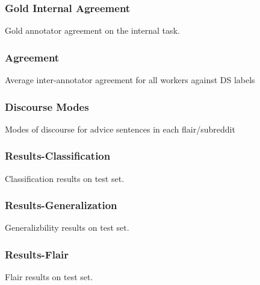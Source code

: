 \begin{frame}[c]\frametitle{Gold Internal Agreement}
    \begin{table}[H]
        \centering
        
        \caption{Gold annotator agreement on the internal task.}
        \label{tab:internal-agreement}
    \end{table}
\end{frame}

\begin{frame}[c]\frametitle{Agreement}
    \begin{table}[H]
        \centering
        
        \caption{Average inter-annotator agreement for all workers against DS labels}
        \label{tab:agreement}
    \end{table}
\end{frame}

\begin{frame}[c]\frametitle{Discourse Modes}
    \begin{table}[H]
        \centering
        
        \caption{Modes of discourse for advice sentences in each flair/subreddit}
        \label{tab:disc-modes}
    \end{table}
\end{frame}

\begin{frame}[c]\frametitle{Results-Classification}
    \begin{table}[H]
        \centering
        
        \caption{Classification results on test set.}
        \label{tab:results-class}
    \end{table}
\end{frame}

\begin{frame}[c]\frametitle{Results-Generalization}
    \begin{table}[H]
        \centering
        
        \caption{Generalizbility results on test set.}
        \label{tab:results-gen}
    \end{table}
\end{frame}

\begin{frame}[c]\frametitle{Results-Flair}
    \begin{table}[H]
        \centering
        
        \caption{Flair results on test set.}
        \label{tab:results-flair}
    \end{table}
\end{frame}


